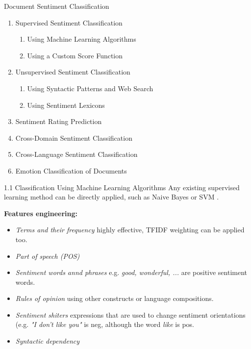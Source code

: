\documentclass[xcolor=table]{beamer}
\begin{document}
\begin{frame}{Document Sentiment Classification}
    \begin{enumerate}
        \item Supervised Sentiment Classification
            \begin{enumerate}
                \item Using Machine Learning Algorithms
                \item Using a Custom Score Function
            \end{enumerate}
        \item Unsupervised Sentiment Classification
            \begin{enumerate}
                \item Using Syntactic Patterns and Web Search
                \item Using Sentiment Lexicons
            \end{enumerate}
        \item Sentiment Rating Prediction
        \item Cross-Domain Sentiment Classification
        \item Cross-Language Sentiment Classification
        \item Emotion Classification of Documents
        
    \end{enumerate}
    
\end{frame}

\begin{frame}{1.1 Classification Using Machine Learning Algorithms}
    Any existing supervised learning method can be directly applied, such as Naive Bayes or SVM \cite{joachims1999transductive} \cite{cristianini2000introduction} \cite{pang2002thumbs}.
    
    \pause
    \textbf{Features engineering:}
    \begin{itemize}
        \item \textit{Terms and their frequency} highly effective, TFIDF weighting can be applied too.
        \item \textit{Part of speech (POS)}
        \item \textit{Sentiment words annd phrases} e.g. \textit{good, wonderful, ...} are positive sentiment words.
        \item \textit{Rules of opinion} using other constructs or language compositions.
        \item \textit{Sentiment shiters} expressions that are used to change sentiment orientations (e.g. \textit{"I don't like you"} is neg, although the word \textit{like} is pos.
        \item \textit{Syntactic dependency}
    \end{itemize}
\end{frame}
\end{document}
